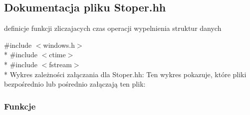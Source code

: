 \hypertarget{_stoper_8hh}{}\subsection{Dokumentacja pliku Stoper.\+hh}
\label{_stoper_8hh}


definicje funkcji zliczajacych czas operacji wypelnienia struktur danych  


{\ttfamily \#include $<$windows.\+h$>$}\\*
{\ttfamily \#include $<$ctime$>$}\\*
{\ttfamily \#include $<$fstream$>$}\\*
Wykres zależności załączania dla Stoper.\+hh\+:
Ten wykres pokazuje, które pliki bezpośrednio lub pośrednio załączają ten plik\+:
\subsubsection*{Funkcje}
